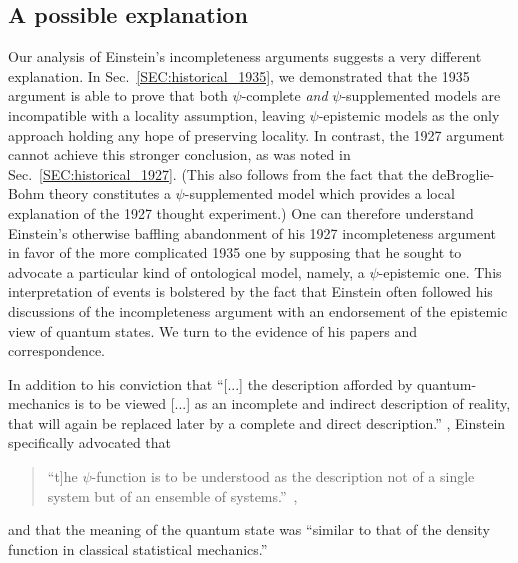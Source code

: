 \documentclass[aps,nofootinbib,12pt]{revtex4-2}
\begin{document}
\subsection{A possible explanation}
 Our analysis of Einstein's incompleteness arguments
suggests a very different explanation. In
Sec.~\ref{SEC:historical_1935}, we demonstrated that the 1935
argument is able to prove that both $\psi $-complete \textit{and}
$\psi$-supplemented models are incompatible with a locality
assumption, leaving $\psi$-epistemic models as the only approach
holding any hope of preserving locality. In contrast, the 1927
argument cannot achieve this stronger conclusion, as was noted in
Sec.~\ref{SEC:historical_1927}. (This also follows from the fact
that the deBroglie-Bohm theory constitutes a $\psi$-supplemented
model which provides a local explanation of the 1927 thought
experiment.) One can therefore understand Einstein's otherwise
baffling abandonment of his 1927 incompleteness argument in favor of
the more complicated 1935 one by supposing that he sought to
advocate a particular kind of ontological model, namely, a
$\psi$-epistemic one. This interpretation of events is bolstered by
the fact that Einstein often followed his discussions of the
incompleteness argument with an endorsement of the epistemic view of
quantum states. We turn to the evidence of his papers and
correspondence.

In addition to his conviction that ``[...] the description afforded
by quantum-mechanics is to be viewed [...] as an incomplete and
indirect description of reality, that will again be replaced later
by a complete and direct description.'' \cite{Edialectica}, Einstein
specifically advocated that
\begin{quote}
\textquotedblleft\lbrack t]he $\psi$-function is to be understood as
the description not of a single system but of an ensemble of
systems.\textquotedblright\ \cite{schilpp},
\end{quote}
and that the meaning of the quantum state was ``similar to that of
the density function in classical statistical
mechanics.''\cite{EtoBreit}
\end{document}
